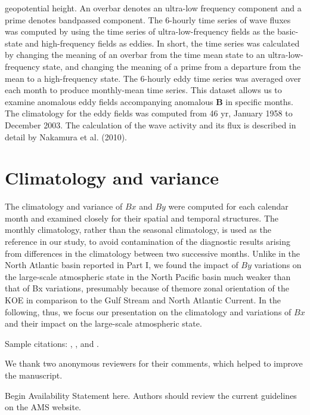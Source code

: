 \documentclass[twocol]{ametsocv6.2}
\begin{document}
geopotential height. An overbar denotes an ultra-low frequency
component and a prime denotes bandpassed
component. The 6-hourly time series of wave fluxes was
computed by using the time series of ultra-low-frequency
fields as the basic-state and high-frequency fields as eddies.
In short, the time series was calculated by changing the
meaning of an overbar from the time mean state to an
ultra-low-frequency state, and changing the meaning of a
prime from a departure from the mean to a high-frequency
state. The 6-hourly eddy time series was averaged over each
month to produce monthly-mean time series. This dataset
allows us to examine anomalous eddy fields accompanying
anomalous $\mathbf B$ in specific months. The climatology for
the eddy fields was computed from 46 yr, January 1958 to
December 2003. The calculation of the wave activity and
its flux is described in detail by Nakamura et al. (2010).


\section{Climatology and variance}
The climatology and variance of $Bx$ and $By$ were computed
for each calendar month and examined closely for
their spatial and temporal structures. The monthly climatology,
rather than the seasonal climatology, is used as the
reference in our study, to avoid contamination of the diagnostic
results arising from differences in the climatology
between two successive months. Unlike in the North Atlantic
basin reported in Part I, we found the impact of $By$
variations on the large-scale atmospheric state in the
North Pacific basin much weaker than that of Bx variations,
presumably because of themore zonal orientation of
the KOE in comparison to the Gulf Stream and North
Atlantic Current. In the following, thus, we focus our
presentation on the climatology and variations of $Bx$ and
their impact on the large-scale atmospheric state.

Sample citations: \citet{Becker+Schmitz2003}, \citet{Knutti2008},
and \citep{MeixnerEA2002,Kuji_Nakajima2002,EmeryEA1986}.

\acknowledgments
We thank two anonymous reviewers for their comments, which helped
to improve the manuscript.

\availstatement
Begin Availability Statement here. Authors should review the current guidelines
on the AMS website.
\end{document}
